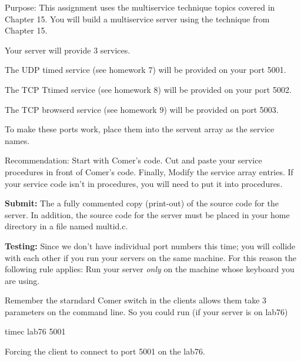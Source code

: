 

\parindent 0pt

Purpose: This assignment uses the multiservice technique
topics covered in Chapter 15.
You will build a multiservice server
using the technique from Chapter 15.

Your server will provide 3 services.

The UDP {\ltt{}timed} service (see homework 7) will be provided
on your port 5001.

The TCP {\ltt{}Ttimed} service (see homework 8) will be provided
on your port 5002.

The TCP {\ltt{}browserd} service (see homework 9) will be provided
on port 5003.

To make these ports work, place them into the {\ltt{}servent} array
as the service names.

Recommendation: Start with Comer's code.
Cut and paste your service procedures in front of Comer's code.
Finally, Modify the service array entries.
If your service code isn't in procedures, you will need to put it 
into procedures.

{\bf Submit:} The a fully commented copy (print-out) of the source code for the 
server.
In addition,
the source code for the server must be placed in your home directory
in a file named {\ltt{}multid.c}.

{\bf Testing:}
Since we don't have individual port numbers this time; you will
collide with each other if you run your servers on the same machine.
For this reason the following rule applies:
Run your server {\it only} on the machine whose keyboard you are using.

Remember the starndard Comer switch in the clients allows them
take 3 parameters on the command line.
So you could run (if your server is on {\ltt{}lab76})

{\ltt{}timec lab76 5001}

Forcing the client to connect to port 5001 on the lab76. 



\bye
